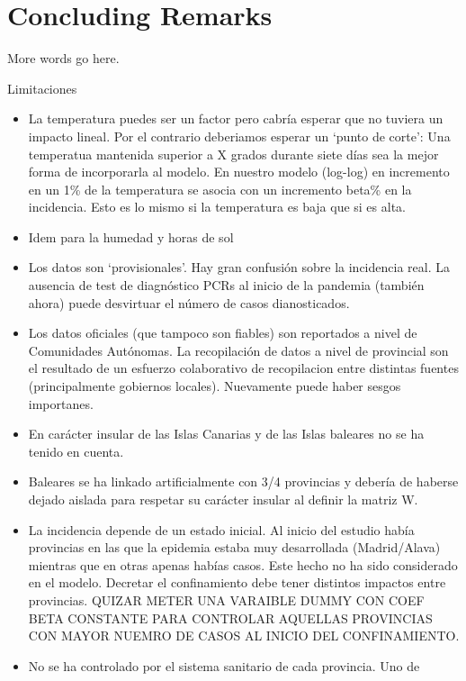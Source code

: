 \documentclass[]{elsarticle} %
\begin{document}
\hypertarget{conclusion}{%
\section{Concluding Remarks}\label{conclusion}}

More words go here.

Limitaciones

\begin{itemize}
\item
  La temperatura puedes ser un factor pero cabría esperar que no tuviera
  un impacto lineal. Por el contrario deberiamos esperar un `punto de
  corte': Una temperatua mantenida superior a X grados durante siete
  días sea la mejor forma de incorporarla al modelo. En nuestro modelo
  (log-log) en incremento en un 1\% de la temperatura se asocia con un
  incremento beta\% en la incidencia. Esto es lo mismo si la temperatura
  es baja que si es alta.
\item
  Idem para la humedad y horas de sol
\item
  Los datos son `provisionales'. Hay gran confusión sobre la incidencia
  real. La ausencia de test de diagnóstico PCRs al inicio de la pandemia
  (también ahora) puede desvirtuar el número de casos dianosticados.
\item
  Los datos oficiales (que tampoco son fiables) son reportados a nivel
  de Comunidades Autónomas. La recopilación de datos a nivel de
  provincial son el resultado de un esfuerzo colaborativo de
  recopilacion entre distintas fuentes (principalmente gobiernos
  locales). Nuevamente puede haber sesgos importanes.
\item
  En carácter insular de las Islas Canarias y de las Islas baleares no
  se ha tenido en cuenta.
\item
  Baleares se ha linkado artificialmente con 3/4 provincias y debería de
  haberse dejado aislada para respetar su carácter insular al definir la
  matriz W.
\item
  La incidencia depende de un estado inicial. Al inicio del estudio
  había provincias en las que la epidemia estaba muy desarrollada
  (Madrid/Alava) mientras que en otras apenas habías casos. Este hecho
  no ha sido considerado en el modelo. Decretar el confinamiento debe
  tener distintos impactos entre provincias. QUIZAR METER UNA VARAIBLE
  DUMMY CON COEF BETA CONSTANTE PARA CONTROLAR AQUELLAS PROVINCIAS CON
  MAYOR NUEMRO DE CASOS AL INICIO DEL CONFINAMIENTO.
\item
  No se ha controlado por el sistema sanitario de cada provincia. Uno de

\end{itemize}
\end{document}
